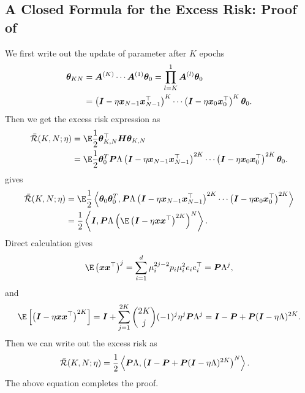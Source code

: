 \subsection{A Closed Formula for the Excess Risk: Proof of }
We first write out the update of parameter after $K$ epochs  
\begin{align*}    {\bm{\theta}}_{KN}&={\bm{A}}^{(K)}\cdots{\bm{A}}^{(1)}{\bm{\theta}}_0=\prod_{l=K}^1 {\bm{A}}^{(l)}{\bm{\theta}}_0 \\
&=\left({\bm{I}}-\eta {\bm{x}}_{N-1}{\bm{x}}_{N-1}^{\top}\right)^K\cdots\left({\bm{I}}-\eta {\bm{x}}_{0}{\bm{x}}_{0}^{\top}\right)^K{\bm{\theta}}_0.
\end{align*}
Then we get the excess risk expression as
\begin{align*}
    \Bar{\cR}(K, N;\eta) &= \E\frac{1}{2}\vtheta_{K,N}^{\top}\mH\vtheta_{K,N} \\
    &=\E\frac{1}{2}\vtheta_0^T\mP\Lambda\left(\mI-\eta \vx_{N-1}\vx_{N-1}^{\top}\right)^{2K}\cdots\left(\mI-\eta \vx_{0}\vx_{0}^{\top}\right)^{2K}\vtheta_0.
\end{align*}
 gives
\begin{align*}
    \Bar{\cR}(K, N;\eta) &=\E\frac{1}{2}\inp{\vtheta_0\vtheta_0^T}{\mP\Lambda\left(\mI-\eta \vx_{N-1}\vx_{N-1}^{\top}\right)^{2K}\cdots\left(\mI-\eta \vx_{0}\vx_{0}^{\top}\right)^{2K}} \\
    &=\frac{1}{2}\inp{\mI}{\mP\Lambda\left(\E\left(\mI-\eta \vx\vx^{\top}\right)^{2K}\right)^N}.
\end{align*}
Direct calculation gives 
\begin{align*}
    \E \left(\vx\vx^{\top}\right)^{j}=\sum_{i=1}^d\mu_i^{2j-2}p_i\mu_i^2e_ie_i^{\top}=\mP\Lambda^j,
\end{align*}
and 
\begin{align*}
    \E\left[\left(\mI-\eta \vx\vx^{\top}\right)^{2K}\right]=\mI+\sum_{j=1}^{2K}\binom{2K}{j}(-1)^j\eta^j\mP\Lambda^j =\mI-\mP+\mP(\mI-\eta\Lambda)^{2K}.
\end{align*}
Then we can write out the excess risk as
\begin{align*}
    \Bar{\mathcal{R}}(K, N;\eta)&=\frac{1}{2}\left\langle {\bm{P}}\Lambda,\left({\bm{I}}-{\bm{P}}+{\bm{P}}({\bm{I}}-\eta\Lambda)^{2K}\right)^N\right\rangle.
\end{align*}
The above equation completes the proof.




